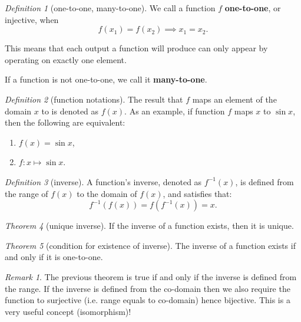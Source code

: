 \documentclass[8pt]{article}
\theoremstyle{remark}
\newtheorem{theorem}{Theorem}[section]
\newtheorem{definition}[theorem]{Definition}
\newtheorem*{remark}{Remark}
\begin{document}
        \begin{definition}[one-to-one, many-to-one]
            We call a function $f$ \textbf{one-to-one}, or injective, when
            $$
                f(x_1) = f(x_2) \implies x_1 = x_2.
            $$
            
            This means that each output a function will produce can only appear by operating on exactly one element.

            If a function is not one-to-one, we call it \textbf{many-to-one}.
        \end{definition}

        \begin{definition}[function notations]
            The result that $f$ maps an element of the domain $x$ to is denoted as $f(x)$. As an example, if function $f$ maps $x$ to $\sin x$, then the following are equivalent:
            \begin{enumerate}
                \item $f(x) = \sin x$,
                \item $f: x \mapsto \sin x$.
            \end{enumerate}
        \end{definition}

        \begin{definition}[inverse]
            A function's inverse, denoted as $f^{-1}(x)$, is defined from the range of $f(x)$ to the domain of $f(x)$, and satisfies that:
            $$
                f^{-1}(f(x)) = f(f^{-1}(x))= x.
            $$
        \end{definition}

        \begin{theorem}[unique inverse]
            If the inverse of a function exists, then it is unique.
        \end{theorem}

        \begin{theorem}[condition for existence of inverse]
            The inverse of a function exists if and only if it is one-to-one.
        \end{theorem}

        \begin{remark}
            The previous theorem is true if and only if the inverse is defined from the range. If the inverse is defined from the co-domain then we also require the function to surjective (i.e. range equals to co-domain) hence bijective. This is a very useful concept (isomorphism)!
        \end{remark}
\end{document}
